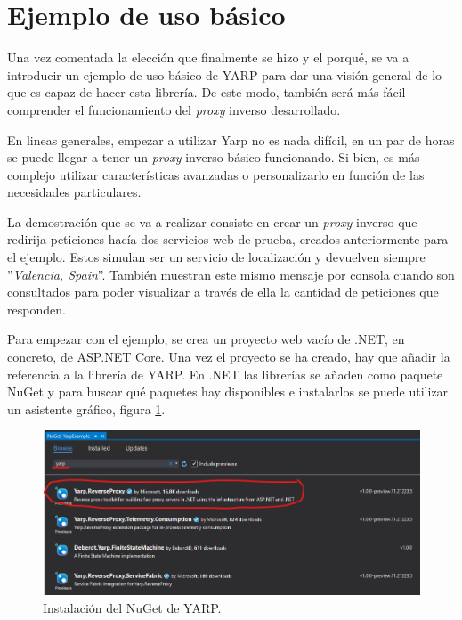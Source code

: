 \documentclass[11pt,spanish,listoffigures]{tfgetsinf}
\begin{document}

	\section{Ejemplo de uso básico} \label{ejemploUsoYARP}

Una vez comentada la elección que finalmente se hizo y el porqué, se va a introducir un ejemplo de uso básico de YARP para dar una visión general de lo que es capaz de hacer esta librería. De este modo, también será más fácil comprender el funcionamiento del \emph{proxy} inverso desarrollado.

En lineas generales, empezar a utilizar Yarp no es nada difícil, en un par de horas se puede llegar a tener un \emph{proxy} inverso básico funcionando. Si bien, es más complejo utilizar características avanzadas o personalizarlo en función de las necesidades particulares.

La demostración que se va a realizar consiste en crear un \emph{proxy} inverso que redirija peticiones hacía dos servicios web de prueba, creados anteriormente para el ejemplo. Estos simulan ser un servicio de localización y devuelven siempre ''\emph{Valencia, Spain}''. También muestran este mismo mensaje por consola cuando son consultados para poder visualizar a través de ella la cantidad de peticiones que responden.

Para empezar con el ejemplo, se crea un proyecto web vacío de .NET, en concreto, de ASP.NET Core. Una vez el proyecto se ha creado, hay que añadir la referencia a la librería de YARP. En .NET las librerías se añaden como paquete NuGet \cite{NuGet} y para buscar qué paquetes hay disponibles e instalarlos se puede utilizar un asistente gráfico, figura \ref{ejemploYARP_instalacionNuGet}.

\begin{figure}[ht]
\centering
\includegraphics[width=1\textwidth]{imagenes/ejemploYARP/instalacionNuGet}
\caption{Instalación del NuGet de YARP.}
	\label{ejemploYARP_instalacionNuGet}
\end{figure}
\end{document}
